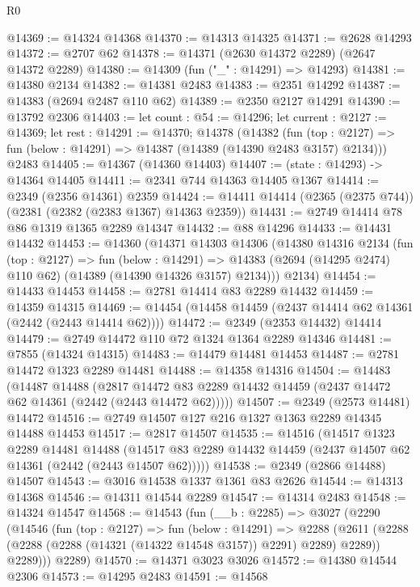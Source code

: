 \begin{lexlean}{R0}
\begin{coremodule}
@14369 := @14324 @14368
@14370 := @14313 @14325
@14371 := @2628 @14293
@14372 := @2707 @62
@14378 := @14371 (@2630 @14372 @2289) (@2647 @14372 @2289)
@14380 := @14309 (fun ("_" : @14291) => @14293)
@14381 := @14380 @2134
@14382 := @14381 @2483
@14383 := @2351 @14292
@14387 := @14383 (@2694 @2487 @110 @62)
@14389 := @2350 @2127 @14291
@14390 := @13792 @2306
@14403 := let count : @54 := @14296;
  let current : @2127 := @14369;
  let rest : @14291 := @14370;
  @14378
    (@14382
      (fun (top : @2127) => fun (below : @14291) => @14387 (@14389 (@14390 @2483 @3157) @2134)))
    @2483
@14405 := @14367 (@14360 @14403)
@14407 := (state : @14293) -> @14364 @14405
@14411 := @2341 @744 @14363 @14405 @1367
@14414 := @2349 (@2356 @14361) @2359
@14424 := @14411 @14414 (@2365 (@2375 @744)) (@2381 (@2382 (@2383 @1367) @14363 @2359))
@14431 := @2749 @14414 @78 @86 @1319 @1365 @2289 @14347
@14432 := @88 @14296
@14433 := @14431 @14432
@14453 := @14360
    (@14371
      @14303
      @14306
      (@14380
        @14316
        @2134
        (fun (top : @2127) =>
        fun (below : @14291) =>
        @14383 (@2694 (@14295 @2474) @110 @62) (@14389 (@14390 @14326 @3157) @2134)))
      @2134)
@14454 := @14433 @14453
@14458 := @2781 @14414 @83 @2289 @14432
@14459 := @14359 @14315
@14469 := @14454 (@14458 @14459 (@2437 @14414 @62 @14361 (@2442 (@2443 @14414 @62))))
@14472 := @2349 (@2353 @14432) @14414
@14479 := @2749 @14472 @110 @72 @1324 @1364 @2289 @14346
@14481 := @7855 (@14324 @14315)
@14483 := @14479 @14481 @14453
@14487 := @2781 @14472 @1323 @2289 @14481
@14488 := @14358 @14316
@14504 := @14483
    (@14487
      @14488
      (@2817 @14472 @83 @2289 @14432 @14459 (@2437 @14472 @62 @14361 (@2442 (@2443 @14472 @62)))))
@14507 := @2349 (@2573 @14481) @14472
@14516 := @2749 @14507 @127 @216 @1327 @1363 @2289 @14345 @14488 @14453
@14517 := @2817 @14507
@14535 := @14516
    (@14517
      @1323
      @2289
      @14481
      @14488
      (@14517 @83 @2289 @14432 @14459 (@2437 @14507 @62 @14361 (@2442 (@2443 @14507 @62)))))
@14538 := @2349 (@2866 @14488) @14507
@14543 := @3016 @14538 @1337 @1361 @83 @2626
@14544 := @14313 @14368
@14546 := @14311 @14544 @2289
@14547 := @14314 @2483
@14548 := @14324 @14547
@14568 := @14543
    (fun (__b : @2285) =>
    @3027
      (@2290
        (@14546
          (fun (top : @2127) =>
          fun (below : @14291) =>
          @2288
            (@2611 (@2288 (@2288 (@2288 (@14321 (@14322 @14548 @3157)) @2291) @2289) @2289))
            @2289)))
      @2289)
@14570 := @14371 @3023 @3026
@14572 := @14380 @14544 @2306
@14573 := @14295 @2483
@14591 := @14568

\end{coremodule}
\end{lexlean}
